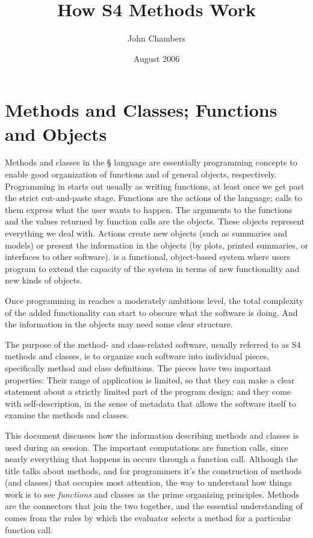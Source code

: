 \documentclass[11pt]{article}
\title{How S4 Methods Work}
\author{John Chambers}
\date{August 2006}
\newif\ifpdf
\begin{document}
\ifpdf
\DeclareGraphicsExtensions{.pdf, .jpg, .tif}
\else
{}
\fi

\maketitle

\section{Methods and Classes; Functions and Objects}
\label{sec:meth-clas-funct}

Methods and classes in the \S{} language are essentially programming concepts to enable good organization  of functions and of general objects, respectively.
Programming in \R{} starts out usually as writing functions, at least once we get past the strict cut-and-paste stage.
Functions are the actions of the language; calls to them express what the user wants to happen.
The arguments to the functions and the values returned by function calls are the objects.
These objects represent everything we deal with.
Actions create new objects (such as summaries and models) or present the information in the objects (by plots, printed summaries, or interfaces to other software).
\R{} is a functional, object-based system where users program to extend the capacity of the system in terms of new functionality and new kinds of objects.

Once programming in \R{} reaches a moderately ambitious level, the total complexity of the added functionality can start to obscure what the software is doing.
And the information in the objects may need some clear structure.

The purpose of the method- and class-related software, usually referred to as S4 methods and classes, is to organize such software into individual pieces, specifically method and class definitions.
The pieces have two important properties:  Their range of application is limited, so that they can make a clear statement about a strictly limited part of the program design; and they come with self-description, in the sense of metadata that allows the software itself to examine the methods and classes.

This document discusses how the information describing methods and classes is used during an \R{} session.
The important computations are function calls, since nearly everything that happens in \R{} occurs through a function call.
Although the title talks about methods, and for programmers it's the construction of methods (and classes) that occupies most attention, the way to understand how things work is to see \emph{functions} and classes as the prime organizing principles.
Methods are the connectors that join the two together, and the essential understanding of  comes from the rules by which the \R{} evaluator selects a method for a particular function call.
\end{document}
